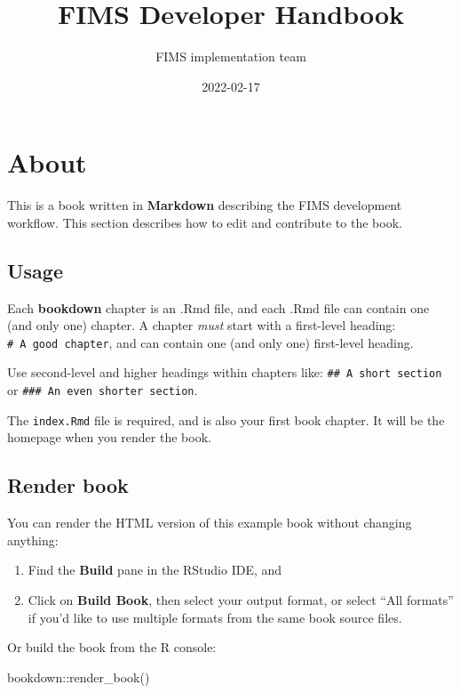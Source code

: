 \documentclass[
]{book}
\title{FIMS Developer Handbook}
\author{FIMS implementation team}
\date{2022-02-17}
\newenvironment{Shaded}{\begin{snugshade}}{\end{snugshade}}
\newcommand{\FunctionTok}[1]{\textcolor[rgb]{0.00,0.00,0.00}{#1}}
\newcommand{\NormalTok}[1]{#1}
\newcommand{\SpecialCharTok}[1]{\textcolor[rgb]{0.00,0.00,0.00}{#1}}
\begin{document}
\maketitle

{
\setcounter{tocdepth}{1}
\tableofcontents
}
\hypertarget{about}{%
\chapter{About}\label{about}}

This is a book written in \textbf{Markdown} describing the FIMS development workflow. This section describes how to edit and contribute to the book.

\hypertarget{usage}{%
\section{Usage}\label{usage}}

Each \textbf{bookdown} chapter is an .Rmd file, and each .Rmd file can contain one (and only one) chapter. A chapter \emph{must} start with a first-level heading: \texttt{\#\ A\ good\ chapter}, and can contain one (and only one) first-level heading.

Use second-level and higher headings within chapters like: \texttt{\#\#\ A\ short\ section} or \texttt{\#\#\#\ An\ even\ shorter\ section}.

The \texttt{index.Rmd} file is required, and is also your first book chapter. It will be the homepage when you render the book.

\hypertarget{render-book}{%
\section{Render book}\label{render-book}}

You can render the HTML version of this example book without changing anything:

\begin{enumerate}
\def\labelenumi{\arabic{enumi}.}
\item
  Find the \textbf{Build} pane in the RStudio IDE, and
\item
  Click on \textbf{Build Book}, then select your output format, or select ``All formats'' if you'd like to use multiple formats from the same book source files.
\end{enumerate}

Or build the book from the R console:

\begin{Shaded}
\begin{Highlighting}[]
\NormalTok{bookdown}\SpecialCharTok{::}\FunctionTok{render\_book}\NormalTok{()}
\end{Highlighting}
\end{Shaded}
\end{document}
